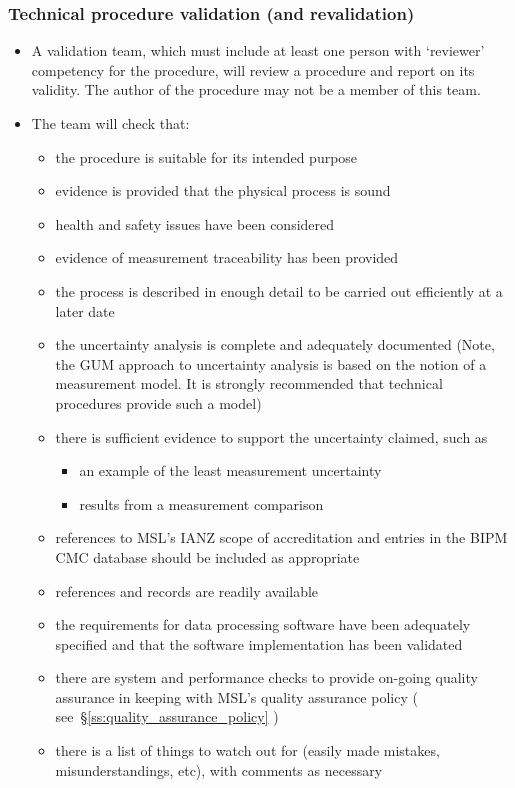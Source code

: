\subsubsection{Technical procedure validation (and revalidation)}
\label{sss:tp_validation}
\begin{itemize}
\item A validation team, which must include at least one person with ‘reviewer’ competency for the procedure, will review a procedure and report on its validity.  The author of the procedure may not be a member of this team.
\item The team will check that: 
\begin{itemize}
\item the procedure is suitable for its intended purpose
\item evidence is provided that the physical process is sound
\item health and safety issues have been considered
\item evidence of measurement traceability has been provided
\item the process is described in enough detail to be carried out efficiently at a later date
\item the uncertainty analysis is complete and adequately documented (Note, the GUM approach to uncertainty analysis is based on the notion of a measurement model. It is strongly recommended that technical procedures provide such a model)
\item there is sufficient evidence to support the uncertainty claimed, such as
\begin{itemize}
\item an example of the least measurement uncertainty
\item results from a measurement comparison
\end{itemize}
\item references to MSL’s IANZ scope of accreditation and entries in the BIPM CMC database should be included as appropriate
\item references and records are readily available 
\item the requirements for data processing software have been adequately specified and that the software implementation has been validated
\item there are system and performance checks to provide on-going quality assurance in keeping with MSL's quality assurance policy ( see~\S\ref{ss:quality_assurance_policy} )
\item there is a list of things to watch out for (easily made mistakes, misunderstandings, etc), with comments as necessary

\end{itemize}
\end{itemize}
